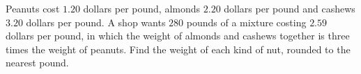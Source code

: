 Peanuts cost $1.20$ dollars per pound, almonds $2.20$ dollars per pound and cashews $3.20$ dollars per pound. A shop wants $280$ pounds of a mixture costing $2.59$ dollars per pound, in which the weight of almonds and cashews together is three times the weight of peanuts. Find the weight of each kind of nut, rounded to the nearest pound.

